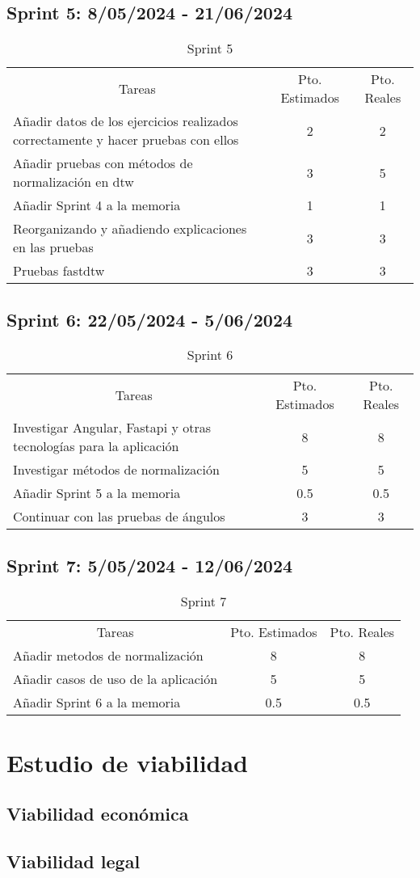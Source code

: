 \subsection{Sprint 5: 8/05/2024 - 21/06/2024 }
\begin{table}[H]
	\begin{tabular}{lcc}
		\multicolumn{1}{c}{Tareas} & Pto. Estimados & Pto. Reales\\
	    Añadir datos de los ejercicios realizados correctamente y hacer pruebas con ellos & 2 & 2 \\
		Añadir pruebas con métodos de normalización en dtw & 3 & 5 \\
		Añadir Sprint 4 a la memoria & 1 &1 \\
		Reorganizando y añadiendo explicaciones en las pruebas & 3 & 3 \\
		Pruebas fastdtw & 3 & 3 \\
	\end{tabular}
	\caption{Sprint 5}
	\label{sprint5}
\end{table}

\subsection{Sprint 6: 22/05/2024 - 5/06/2024 }
\begin{table}[H]
	\begin{tabular}{lcc}
		\multicolumn{1}{c}{Tareas} & Pto. Estimados & Pto. Reales\\
		Investigar Angular, Fastapi y otras tecnologías para la aplicación & 8 & 8 \\
		Investigar métodos de normalización & 5 & 5 \\
		Añadir Sprint 5 a la memoria & 0.5 &0.5 \\
		Continuar con las pruebas de ángulos & 3 & 3 \\
	\end{tabular}
	\caption{Sprint 6}
	\label{sprint6}
\end{table}

\subsection{Sprint 7: 5/05/2024 - 12/06/2024 }
\begin{table}[H]
	\begin{tabular}{lcc}
		\multicolumn{1}{c}{Tareas} & Pto. Estimados & Pto. Reales\\
		Añadir metodos de normalización & 8 & 8 \\
		Añadir casos de uso de la aplicación & 5 & 5 \\
		Añadir Sprint 6 a la memoria & 0.5 &0.5 \\
	\end{tabular}
	\caption{Sprint 7}
	\label{sprint7}
\end{table}

\section{Estudio de viabilidad}

\subsection{Viabilidad económica}

\subsection{Viabilidad legal}


